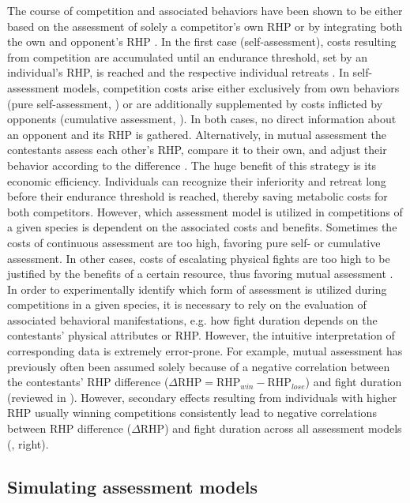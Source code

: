 The course of competition and associated behaviors have been shown to be either based on the assessment of solely a competitor's own RHP or by integrating both the own and opponent's RHP \citep{Enquist1990, Taylor2001, Huyghe2005}. In the first case (self-assessment), costs resulting from competition are accumulated until an endurance threshold, set by an individual's RHP, is reached and the respective individual retreats \citep{ArnottElwood2009}. In self-assessment models, competition costs arise either exclusively from own behaviors (pure self-assessment, \citealp{Taylor2003}) or are additionally supplemented by costs inflicted by opponents (cumulative assessment, \citealp{Payne1998}). In both cases, no direct information about an opponent and its RHP is gathered. Alternatively, in mutual assessment the contestants assess each other's RHP, compare it to their own, and adjust their behavior according to the difference \citep{EnquistLeimar1987}. The huge benefit of this strategy is its economic efficiency. Individuals can recognize their inferiority and retreat long before their endurance threshold is reached, thereby saving metabolic costs for both competitors. However, which assessment model is utilized in competitions of a given species is dependent on the associated costs and benefits. Sometimes the costs of continuous assessment are too high, favoring pure self- or cumulative assessment. In other cases, costs of escalating physical fights are too high to be justified by the benefits of a certain resource, thus favoring mutual assessment \citep{ArnottElwood2009}. In order to experimentally identify which form of assessment is utilized during competitions in a given species, it is necessary to rely on the evaluation of associated behavioral manifestations, e.g. how fight duration depends on the contestants' physical attributes or RHP. However, the intuitive interpretation of corresponding data is extremely error-prone. For example, mutual assessment has previously often been assumed solely because of a negative correlation between the contestants' RHP difference ($\Delta \text{RHP} = \text{RHP}_{win} - \text{RHP}_{lose}$) and fight duration (reviewed in \citealp{ArnottElwood2009}). However, secondary effects resulting from individuals with higher RHP usually winning competitions consistently lead to negative correlations between RHP difference ($\Delta$RHP) and fight duration across all assessment models (, right).  

\subsection{Simulating assessment models}

